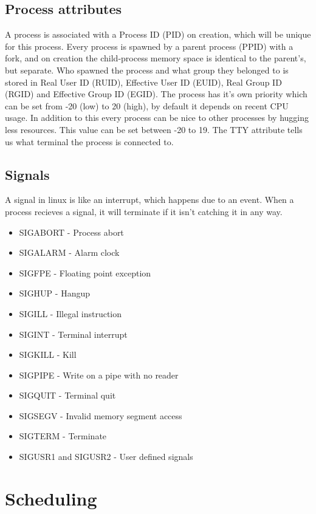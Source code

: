 \documentclass[12pt]{article}
\begin{document}
\subsection{Process attributes}
A process is associated with a Process ID (PID) on creation, which will be unique for this process. 
Every process is spawned by a parent process (PPID) with a fork, and on creation the child-process memory space is identical to the parent's, but separate.
Who spawned the process and what group they belonged to is stored in Real User ID (RUID), Effective User ID (EUID), Real Group ID (RGID) and Effective Group ID (EGID).
The process has it's own priority which can be set from -20 (low) to 20 (high), by default it depends on recent CPU usage. 
In addition to this every process can be nice to other processes by hugging less resources. This value can be set between -20 to 19.
The TTY attribute tells us what terminal the process is connected to.

\subsection{Signals}
A signal in linux is like an interrupt, which happens due to an event. 
When a process recieves a signal, it will terminate if it isn't catching it in any way.
\begin{itemize}
  \item SIGABORT - Process abort
  \item SIGALARM - Alarm clock
  \item SIGFPE - Floating point exception
  \item SIGHUP - Hangup
  \item SIGILL - Illegal instruction
  \item SIGINT - Terminal interrupt
  \item SIGKILL - Kill
  \item SIGPIPE - Write on a pipe with no reader
  \item SIGQUIT - Terminal quit
  \item SIGSEGV - Invalid memory segment access
  \item SIGTERM - Terminate
  \item SIGUSR1 and SIGUSR2 - User defined signals
\end{itemize}

\section{Scheduling} %
\end{document}
